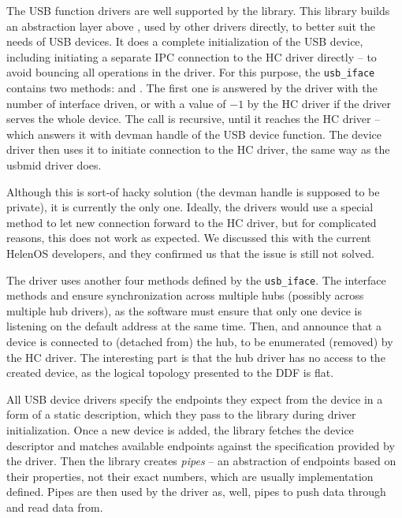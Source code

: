 The USB function drivers are well supported by the  library.
This library builds an abstraction layer above , used by other
drivers directly, to better suit the needs of USB devices. It does a complete
initialization of the USB device, including initiating a separate IPC
connection to the HC driver directly -- to avoid bouncing all operations in the
 driver. For this purpose, the \texttt{usb\_iface} contains two
methods:  and . The first one is
answered by the  driver with the number of interface driven, or
with a value of $-1$ by the HC driver if the driver serves the whole device.
The  call is recursive, until it reaches the HC
driver -- which answers it with devman handle of the USB device function. The
device driver then uses it to initiate connection to the HC driver, the same
way as the usbmid driver does.

Although this is sort-of hacky solution (the devman handle is supposed to be
private), it is currently the only one. Ideally, the drivers would use
a special method to let new connection forward to the HC driver, but for
complicated reasons, this does not work as expected. We discussed this with the
current HelenOS developers, and they confirmed us that the issue is still not
solved.

The  driver uses another four methods defined by the
\texttt{usb\_iface}. The interface methods  and
 ensure synchronization across multiple hubs
(possibly across multiple hub drivers), as the software must ensure that only one
device is listening on the default address at the same time. Then,
 and  announce that a device is
connected to (detached from) the hub, to be enumerated (removed) by the HC
driver. The interesting part is that the hub driver has no access to the
created device, as the logical topology presented to the DDF is flat.

All USB device drivers specify the endpoints they expect from the device in
a form of a static description, which they pass to the  library
during driver initialization. Once a new device is added, the library
fetches the device descriptor and matches available endpoints against the
specification provided by the driver. Then the library creates \emph{pipes} --
an abstraction of endpoints based on their properties, not their exact numbers,
which are usually implementation defined. Pipes are then used by the driver
as, well, pipes to push data through and read data from.

